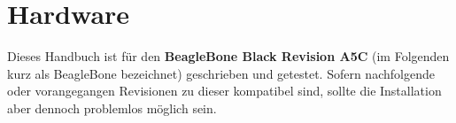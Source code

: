 \documentclass[manual.tex]{subfiles}
\begin{document}
\section{Hardware}
Dieses Handbuch ist für den \textbf{BeagleBone Black Revision A5C} (im Folgenden kurz als BeagleBone bezeichnet) geschrieben und getestet. Sofern nachfolgende oder vorangegangen Revisionen zu dieser kompatibel sind, sollte die Installation aber dennoch problemlos möglich sein.
\end{document}
